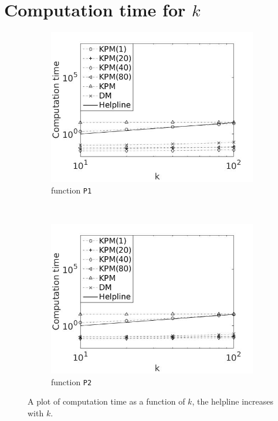 \section{Computation time for $k$} \label{sec:stimek}
\begin{figure}[H]
        \centering
        \begin{subfigure}[b]{0.45\textwidth}
                \includegraphics[width=\textwidth]{fig/n7timevsk1}
                \caption{function \texttt{P1}}
                \label{fig:timek1}
        \end{subfigure}%
~
        \begin{subfigure}[b]{0.45\textwidth}
                \includegraphics[width=\textwidth]{fig/n8timevsk2}
                \caption{function \texttt{P2}}
                \label{fig:timek2}
        \end{subfigure}
        \caption{A plot of computation time as a function of $k$, the helpline increases with $k$.}\label{fig:timek}
\end{figure}

